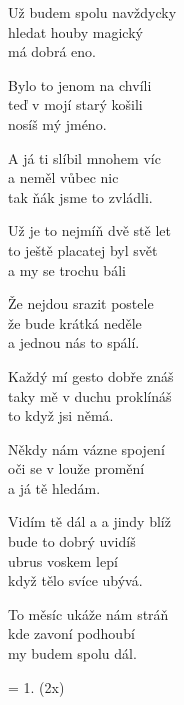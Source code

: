 
\ve{}
Už budem spolu navždycky\\
hledat houby magický\\
má dobrá eno.

Bylo to jenom na chvíli\\
teď v mojí starý košili\\
nosíš mý jméno.

\ve{}
A já ti slíbil mnohem víc\\
a neměl vůbec nic\\
tak ňák jsme to zvládli.

\vspace{-3 pt}

\cho{}
Už je to nejmíň dvě stě let\\
to ještě placatej byl svět\\
a my se trochu báli

Že nejdou srazit postele\\
že bude krátká neděle\\
a jednou nás to spálí.

\vspace{-3 pt}

\ve{}
Každý mí gesto dobře znáš\\
taky mě v duchu proklínáš\\
to když jsi němá.

Někdy nám vázne spojení\\
oči se v louže promění\\
a já tě hledám.

\vspace{-3 pt}

\ve{}
Vidím tě dál a a jindy blíž\\
bude to dobrý uvidíš\\
ubrus voskem lepí\\
když tělo svíce ubývá.

\vspace{-3 pt}

\cho{}

\vspace{-3 pt}

\ve{}
To měsíc ukáže nám stráň\\
kde zavoní podhoubí\\
my budem spolu dál.

\vspace{-3 pt}

\ve{}
 = 1. (2x)

\esong
